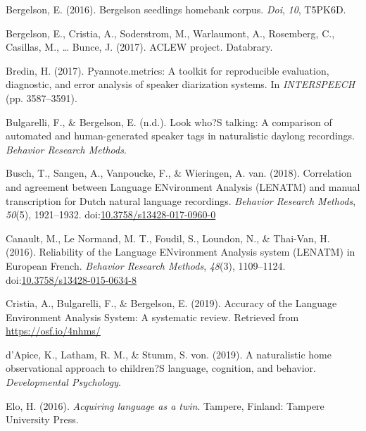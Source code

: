 \documentclass[english,table,man,floatsintext]{apa6}
\begin{document}
\setlength{\parindent}{-0.5in}
\setlength{\leftskip}{0.5in}

\hypertarget{refs}{}
\leavevmode\hypertarget{ref-bergelson2016bergelson}{}%
Bergelson, E. (2016). Bergelson seedlings homebank corpus. \emph{Doi}, \emph{10}, T5PK6D.

\leavevmode\hypertarget{ref-bergelson2017}{}%
Bergelson, E., Cristia, A., Soderstrom, M., Warlaumont, A., Rosemberg, C., Casillas, M., \ldots{} Bunce, J. (2017). ACLEW project. Databrary.

\leavevmode\hypertarget{ref-bredin2017pyannote}{}%
Bredin, H. (2017). Pyannote.metrics: A toolkit for reproducible evaluation, diagnostic, and error analysis of speaker diarization systems. In \emph{INTERSPEECH} (pp. 3587--3591).

\leavevmode\hypertarget{ref-bulgarelli2019}{}%
Bulgarelli, F., \& Bergelson, E. (n.d.). Look who?S talking: A comparison of automated and human-generated speaker tags in naturalistic daylong recordings. \emph{Behavior Research Methods}.

\leavevmode\hypertarget{ref-Busch2018}{}%
Busch, T., Sangen, A., Vanpoucke, F., \& Wieringen, A. van. (2018). Correlation and agreement between Language ENvironment Analysis (LENATM) and manual transcription for Dutch natural language recordings. \emph{Behavior Research Methods}, \emph{50}(5), 1921--1932. doi:\href{https://doi.org/10.3758/s13428-017-0960-0}{10.3758/s13428-017-0960-0}

\leavevmode\hypertarget{ref-Canault2016}{}%
Canault, M., Le Normand, M. T., Foudil, S., Loundon, N., \& Thai-Van, H. (2016). Reliability of the Language ENvironment Analysis system (LENATM) in European French. \emph{Behavior Research Methods}, \emph{48}(3), 1109--1124. doi:\href{https://doi.org/10.3758/s13428-015-0634-8}{10.3758/s13428-015-0634-8}

\leavevmode\hypertarget{ref-Cristia}{}%
Cristia, A., Bulgarelli, F., \& Bergelson, E. (2019). Accuracy of the Language Environment Analysis System: A systematic review. Retrieved from \url{https://osf.io/4nhms/}

\leavevmode\hypertarget{ref-d2019naturalistic}{}%
d'Apice, K., Latham, R. M., \& Stumm, S. von. (2019). A naturalistic home observational approach to children?S language, cognition, and behavior. \emph{Developmental Psychology}.

\leavevmode\hypertarget{ref-Elo}{}%
Elo, H. (2016). \emph{Acquiring language as a twin}. Tampere, Finland: Tampere University Press.
\end{document}
